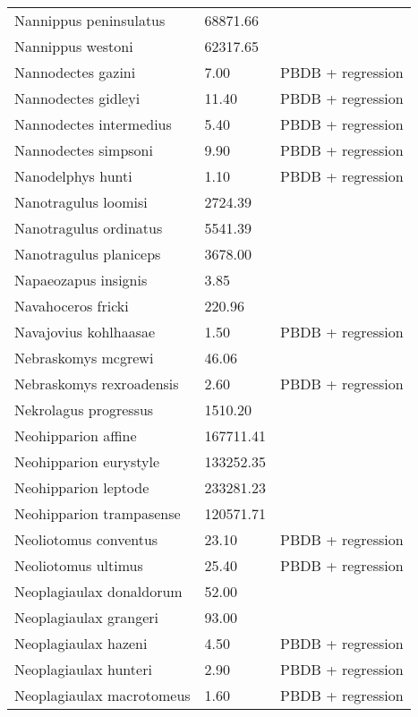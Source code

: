 \begin{longtable}{p{} p{} p{}}
    Nannippus peninsulatus & 68871.66 & \cite{Tomiya2013} \\ 
    Nannippus westoni & 62317.65 & \cite{Tomiya2013} \\ 
    Nannodectes gazini & 7.00 & PBDB + regression \\ 
    Nannodectes gidleyi & 11.40 & PBDB + regression \\ 
    Nannodectes intermedius & 5.40 & PBDB + regression \\ 
    Nannodectes simpsoni & 9.90 & PBDB + regression \\ 
    Nanodelphys hunti & 1.10 & PBDB + regression \\ 
    Nanotragulus loomisi & 2724.39 & \cite{Tomiya2013} \\ 
    Nanotragulus ordinatus & 5541.39 & \cite{Tomiya2013} \\ 
    Nanotragulus planiceps & 3678.00 & \cite{McKenna2011} \\ 
    Napaeozapus insignis & 3.85 & \cite{Smith2004} \\ 
    Navahoceros fricki & 220.96 & \cite{Smith2004} \\ 
    Navajovius kohlhaasae & 1.50 & PBDB + regression \\ 
    Nebraskomys mcgrewi & 46.06 & \cite{Tomiya2013} \\ 
    Nebraskomys rexroadensis & 2.60 & PBDB + regression \\ 
    Nekrolagus progressus & 1510.20 & \cite{Tomiya2013} \\ 
    Neohipparion affine & 167711.41 & \cite{Tomiya2013} \\ 
    Neohipparion eurystyle & 133252.35 & \cite{Tomiya2013} \\ 
    Neohipparion leptode & 233281.23 & \cite{Tomiya2013} \\ 
    Neohipparion trampasense & 120571.71 & \cite{Tomiya2013} \\ 
    Neoliotomus conventus & 23.10 & PBDB + regression \\ 
    Neoliotomus ultimus & 25.40 & PBDB + regression \\ 
    Neoplagiaulax donaldorum & 52.00 & \cite{Wilson2012} \\ 
    Neoplagiaulax grangeri & 93.00 & \cite{Wilson2012} \\ 
    Neoplagiaulax hazeni & 4.50 & PBDB + regression \\ 
    Neoplagiaulax hunteri & 2.90 & PBDB + regression \\ 
    Neoplagiaulax macrotomeus & 1.60 & PBDB + regression \\ 

\end{longtable}

